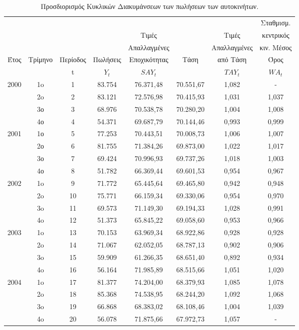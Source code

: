 \begin{table} [h]
  \caption{Προσδιορισμός Κυκλικών Διακυμάνσεων των πωλήσεων των αυτοκινήτων.} 
  \label{tab_4}
  \begin{center}
    \begin{tabular}{|c|c|c|c|c|c|c|c|}
      \hline
           &   &   &   &
           &   &  &Σταθμισμ.      \\
           &   &   &
           & Τιμές   &     &Τιμές    & κεντρικός   \\
          &   &   & 
           &Απαλλαγμένες  &  &Απαλλαγμένες  &κιν. Μέσος  \\
          Έτος  &Τρίμηνο  & Περίοδος & Πωλήσεις
            &Εποχικότητας  & Τάση  & από Τάση   &Όρος  \\
        &  & t  &$ Y_t$  &$ SAY_t$  &  & $ TAY_t$ & $ WA_t$ \\
      \hline \hline
      2000 &  1o  &  1  &  83.754  &  76.371,48  &  70.551,67  & 1,082  &  -\\
           &  2o  &  2  &  83.121  &  72.576,98  &  70.415,93  & 1,031  &  1,037\\
           & 3ο & 3  &  68.976 & 70.538,78  & 70.280,20  & 1,004 & 1,008 \\
           & 4ο & 4 & 54.371 & 69.687,79 & 70.144,46  & 0,993 & 0,999 \\
           
        2001   & 1ο & 5  & 77.253  & 70.443,51  &  70.008,73 & 1,006 &  1,007\\
        & 2ο & 6 & 81.755 & 71.384,26 & 69.873,00  & 1,022 & 1,017\\
        & 3ο & 7  &69.424  & 70.996,93 & 69.737,26 & 1,018 &1,003 \\
        & 4ο &8  & 51.782 & 66.369,44 & 69.601,53 & 0,954 & 0,967\\
     2002   & 1o & 9 & 71.772 & 65.445,64 & 69.465,80 & 0,942 & 0,948 \\
     & 2o  & 10 & 75.771 & 66.159,34 & 69.330,06 & 0,954 & 0,970\\
     & 3o & 11 & 69.573 & 71.149,30 & 69.194,33 & 1,028 & 0,991\\
     & 4o & 12 & 51.373 & 65.845,22 &  69.058,60 & 0,953 &0,966\\
   2003  & 1o & 13 &70.153  & 63.969,34 & 68.922,86 & 0,928  &0,928\\
     & 2o & 14 &71.067 & 62.052,05 & 68.787,13 & 0,902& 0,906\\
     & 3o & 15 & 59.909  & 61.266,35 &68.651,40  & 0,892 &0,934\\
      & 4o & 16 & 56.164 & 71.985,89 & 68.515,66 & 1,051 & 1,020\\
      2004& 1o &  17& 81.377 & 74.204,00 & 68.379,93 & 1,085 & 1,078\\
      & 2o & 18 & 85.368 & 74.538,95  & 68.244,20 &1,092 &1,068\\
      & 3o &19  & 66.868 & 68.383,02 & 68.108,46 & 1,004 &1,039\\
      & 4o & 20 & 56.078 & 71.875,66 & 67.972,73 & 1,057 &-\\
     
      \hline
    \end{tabular}
  \end{center}
\end{table}
